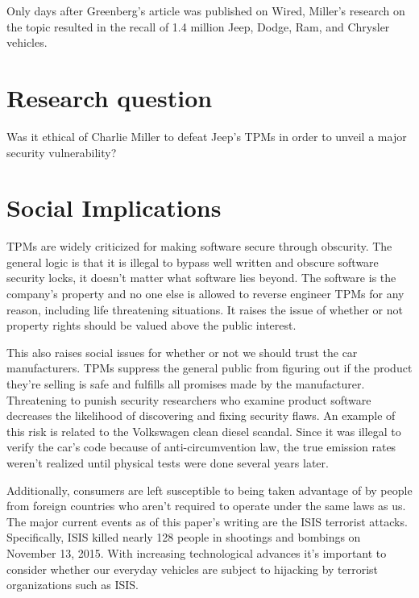 \documentclass[12pt]{article}
\begin{document}
\begin{multicols}{2}
Only days after Greenberg's article was published on Wired, Miller's research on the topic resulted in the recall of 1.4 million Jeep, Dodge, Ram, and Chrysler vehicles.\cite{guardian} 


\section{Research question} 

Was it ethical of Charlie Miller to defeat Jeep's TPMs in order to unveil a major security vulnerability?

\section{Social Implications} 


TPMs are widely criticized for making software secure through obscurity.\cite{chris} The general logic is that it is illegal to bypass well written and obscure software security locks, it doesn't matter what software lies beyond. The software is the company's property and no one else is allowed to reverse engineer TPMs for any reason, including life threatening situations.\cite{dictionary} It raises the issue of whether or not property rights should be valued above the public interest.\cite{turner}

This also raises social issues for whether or not we should trust the car manufacturers. TPMs suppress the general public from figuring out if the product they're selling is safe and fulfills all promises made by the manufacturer. Threatening to punish security researchers who examine product software decreases the likelihood of discovering and fixing security flaws. An example of this risk is related to the Volkswagen clean diesel scandal. Since it was illegal to verify the car's code because of anti-circumvention law, the true emission rates weren't realized until physical tests were done several years later.\cite{chris}

Additionally, consumers are left susceptible to being taken advantage of by people from foreign countries who aren't required to operate under the same laws as us.\cite{turner} 
The major current events as of this paper's writing are the ISIS terrorist attacks. Specifically, ISIS killed nearly 128 people in shootings and bombings on November 13, 2015.\cite{isis} With increasing technological advances it's important to consider whether our everyday vehicles are subject to hijacking by terrorist organizations such as ISIS. \cite{turner}


\end{multicols}
\end{document}
